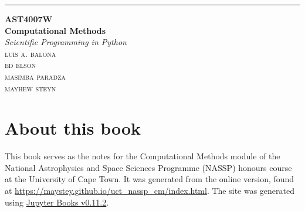 \begin{titlepage} %
	
	\raggedleft %
	
	\rule{1pt}{\textheight} %
	\hspace{0.05\textwidth} %
	\parbox[b]{0.75\textwidth}{ %
		
		{\Huge\bfseries AST4007W} \\[0.5\baselineskip]
		{\Huge\bfseries Computational Methods}
		\\[2\baselineskip] %
		{\large\textit{Scientific Programming in Python}}\\[4\baselineskip] %
		{\Large\textsc{luis a. balona\\ ed elson\\ masimba paradza\\ mayhew steyn}} %
		
		\vspace{0.5\textheight} %
		
	}

\end{titlepage}


\section*{About this book}

This book serves as the notes for the Computational Methods module of the National Astrophysics and Space Sciences Programme (NASSP) honours course at the University of Cape Town. It was generated from the online version, found at \url{https://maystey.github.io/uct_nassp_cm/index.html}. The site was generated using \href{https://jupyterbook.org/intro.html}{Jupyter Books v0.11.2}.\\


